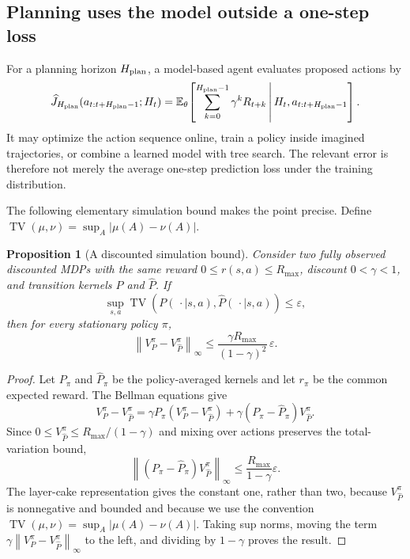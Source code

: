\documentclass[11pt]{amsart}
\numberwithin{equation}{section}
\theoremstyle{definition}
\theoremstyle{plain}
\newtheorem{proposition}[definition]{Proposition}
\theoremstyle{remark}
\newcommand{\E}{\mathbb{E}}
\newcommand{\norm}[1]{\left\lVert#1\right\rVert}
\DeclareMathOperator{\TV}{TV}
\begin{document}
\subsection{Planning uses the model outside a one-step loss}

For a planning horizon $H_{\rm plan}$, a model-based agent evaluates proposed
actions by
\begin{equation}\label{eq:model-return}
 \widehat J_{H_{\rm plan}}(a_{t:t+H_{\rm plan}-1};H_t)
 =\E_\theta\!\left[
   \sum_{k=0}^{H_{\rm plan}-1}\gamma^kR_{t+k}
   \,\middle|\,
   H_t,a_{t:t+H_{\rm plan}-1}
 \right].
\end{equation}
It may optimize the action sequence online, train a policy inside imagined
trajectories, or combine a learned model with tree search.  The relevant error
is therefore not merely the average one-step prediction loss under the training
distribution.

The following elementary simulation bound makes the point precise.  Define
$\TV(\mu,\nu)=\sup_A|\mu(A)-\nu(A)|$.

\begin{proposition}[A discounted simulation bound]
\label{prop:simulation-lemma}
Consider two fully observed discounted MDPs with the same reward
$0\le r(s,a)\le R_{\max}$, discount $0<\gamma<1$, and transition kernels
$P$ and $\widehat P$.  If
\begin{equation}\label{eq:uniform-tv-error}
 \sup_{s,a}\TV(P(\,\cdot\mid s,a),\widehat P(\,\cdot\mid s,a))
 \le\varepsilon,
\end{equation}
then for every stationary policy $\pi$,
\begin{equation}\label{eq:simulation-bound}
 \norm{V_P^\pi-V_{\widehat P}^\pi}_\infty
 \le
 \frac{\gamma R_{\max}}{(1-\gamma)^2}\,\varepsilon.
\end{equation}
\end{proposition}

\begin{proof}
Let $P_\pi$ and $\widehat P_\pi$ be the policy-averaged kernels and let
$r_\pi$ be the common expected reward.  The Bellman equations give
\[
 V_P^\pi-V_{\widehat P}^\pi
 =\gamma P_\pi(V_P^\pi-V_{\widehat P}^\pi)
  +\gamma(P_\pi-\widehat P_\pi)V_{\widehat P}^\pi.
\]
Since $0\le V_{\widehat P}^\pi\le R_{\max}/(1-\gamma)$ and mixing over actions
preserves the total-variation bound,
\[
 \norm{(P_\pi-\widehat P_\pi)V_{\widehat P}^\pi}_\infty
 \le\frac{R_{\max}}{1-\gamma}\varepsilon.
\]
The layer-cake representation gives the constant one, rather than two,
because $V_{\widehat P}^\pi$ is nonnegative and bounded and because we use the
convention $\TV(\mu,\nu)=\sup_A|\mu(A)-\nu(A)|$.
Taking sup norms, moving the term
$\gamma\norm{V_P^\pi-V_{\widehat P}^\pi}_\infty$ to the left, and dividing by
$1-\gamma$ proves the result.
\end{proof}
\end{document}
